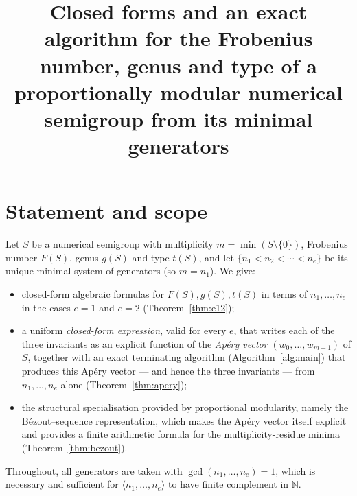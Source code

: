 \documentclass{amsart}
\theoremstyle{definition}
\newcommand{\NN}{\mathbb{N}}
\begin{document}
\title{Closed forms and an exact algorithm for the Frobenius number,
genus and type of a proportionally modular numerical semigroup
from its minimal generators}

\maketitle

\section{Statement and scope}

Let $S$ be a numerical semigroup with multiplicity $m=\min(S\setminus\{0\})$,
Frobenius number $F(S)$, genus $g(S)$ and type $t(S)$, and let
$\{n_1<n_2<\cdots<n_e\}$ be its unique minimal system of generators (so
$m=n_1$). We give:

\begin{itemize}
\item closed-form algebraic formulas for $F(S),g(S),t(S)$ in terms of
$n_1,\dots,n_e$ in the cases $e=1$ and $e=2$ (Theorem~\ref{thm:e12});
\item a uniform \emph{closed-form expression}, valid for every $e$, that
writes each of the three invariants as an explicit function of the
\emph{Ap\'ery vector} $(w_0,\dots,w_{m-1})$ of $S$, together with an exact
terminating algorithm (Algorithm~\ref{alg:main}) that produces this
Ap\'ery vector --- and hence the three invariants --- from
$n_1,\dots,n_e$ alone (Theorem~\ref{thm:apery});
\item the structural specialisation provided by proportional modularity,
namely the B\'ezout--sequence representation, which makes the Ap\'ery
vector itself explicit and provides a finite arithmetic formula for the
multiplicity-residue minima (Theorem~\ref{thm:bezout}).
\end{itemize}

Throughout, all generators are taken with $\gcd(n_1,\dots,n_e)=1$, which is
necessary and sufficient for $\langle n_1,\dots,n_e\rangle$ to have finite
complement in $\NN$.
\end{document}
